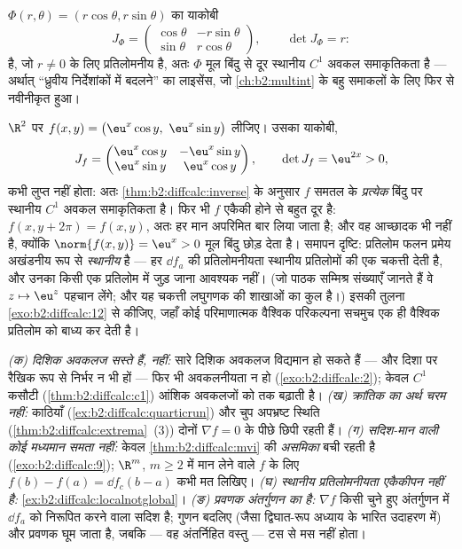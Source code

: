 \begin{example}[ध्रुवीय निर्देशांक]\label{ex:b2:diffcalc:polar}
$\Phi(r, \theta) = (r\cos\theta, r\sin\theta)$ का याकोबी
\[
J_\Phi = \begin{pmatrix} \cos\theta & -r\sin\theta\\ \sin\theta &
r\cos\theta \end{pmatrix},
\qquad \det J_\Phi = r :
\]
है, जो $r \neq 0$ के लिए प्रतिलोमनीय है, अतः $\Phi$ मूल बिंदु से दूर स्थानीय $C^1$
अवकल समाकृतिकता है --- अर्थात् ``ध्रुवीय निर्देशांकों में बदलने'' का
लाइसेंस, जो \cref{ch:b2:multint} के बहु समाकलों के लिए फिर से नवीनीकृत हुआ।
\end{example}

\begin{example}[सर्वत्र स्थानीय, कहीं भी वैश्विक नहीं]\label{ex:b2:diffcalc:localnotglobal}
$\R^2$ पर $f(x, y) = \bigl(\eu^x\cos y,\ \eu^x\sin y\bigr)$ लीजिए। उसका याकोबी,
\[
J_f = \begin{pmatrix}
\eu^x\cos y & -\eu^x\sin y\\
\eu^x\sin y & \eu^x\cos y
\end{pmatrix},
\qquad
\det J_f = \eu^{2x} > 0 ,
\]
कभी लुप्त नहीं होता: अतः \cref{thm:b2:diffcalc:inverse} के अनुसार $f$ समतल के \emph{प्रत्येक} बिंदु
पर स्थानीय $C^1$ अवकल समाकृतिकता है। फिर भी $f$ एकैकी होने से बहुत दूर है:
$f(x, y + 2\pi) = f(x, y)$, अतः हर मान अपरिमित बार लिया जाता है; और वह आच्छादक भी नहीं है,
क्योंकि $\norm{f(x, y)} = \eu^x > 0$ मूल बिंदु छोड़ देता है। समापन दृष्टि: प्रतिलोम फलन प्रमेय
अखंडनीय रूप से \emph{स्थानीय} है --- हर $\dd f_a$ की प्रतिलोमनीयता स्थानीय
प्रतिलोमों की एक चकत्ती देती है, और उनका किसी एक प्रतिलोम में जुड़ जाना
आवश्यक नहीं। (जो पाठक सम्मिश्र संख्याएँ जानते हैं वे $z \mapsto
\eu^z$ पहचान लेंगे; और
यह चकत्ती लघुगणक की शाखाओं का कुल है।) इसकी तुलना \cref{exo:b2:diffcalc:12} से कीजिए, जहाँ कोई
परिमाणात्मक वैश्विक परिकल्पना सचमुच एक ही वैश्विक प्रतिलोम को बाध्य कर
देती है।
\end{example}

\begin{remark}[सामान्य भूलें]
\emph{(क) दिशिक अवकलज सस्ते हैं,  नहीं:} सारे दिशिक अवकलज विद्यमान हो
सकते हैं --- और दिशा पर रैखिक रूप से निर्भर न भी हों --- फिर भी अवकलनीयता
न हो (\cref{exo:b2:diffcalc:2}); केवल $C^1$ कसौटी (\cref{thm:b2:diffcalc:c1}) आंशिक अवकलजों को  तक बढ़ाती है।
\emph{(ख) क्रांतिक का अर्थ चरम नहीं:} काठियाँ (\cref{ex:b2:diffcalc:quarticrun}) और चुप अपभ्रष्ट स्थिति
(\cref{thm:b2:diffcalc:extrema}~(3)) दोनों $\nabla f = 0$ के पीछे छिपी रहती हैं। \emph{(ग) सदिश-मान वाली कोई
मध्यमान समता नहीं:} केवल \cref{thm:b2:diffcalc:mvi} की \emph{असमिका} बची रहती है (\cref{exo:b2:diffcalc:9}); $\R^m$,
$m \geq 2$ में मान लेने वाले $f$ के लिए $f(b) - f(a) = \dd
f_c(b-a)$ कभी मत लिखिए। \emph{(घ) स्थानीय
प्रतिलोमनीयता एकैकीपन नहीं है:} \cref{ex:b2:diffcalc:localnotglobal}। \emph{(ङ) प्रवणक अंतर्गुणन का है:}
$\nabla f$ किसी चुने हुए अंतर्गुणन में $\dd f_a$ को निरूपित करने वाला सदिश है; गुणन
बदलिए (जैसा द्विघात-रूप अध्याय के भारित उदाहरण में) और प्रवणक घूम जाता है,
जबकि  --- वह अंतर्निहित वस्तु --- टस से मस नहीं होता।
\end{remark}

